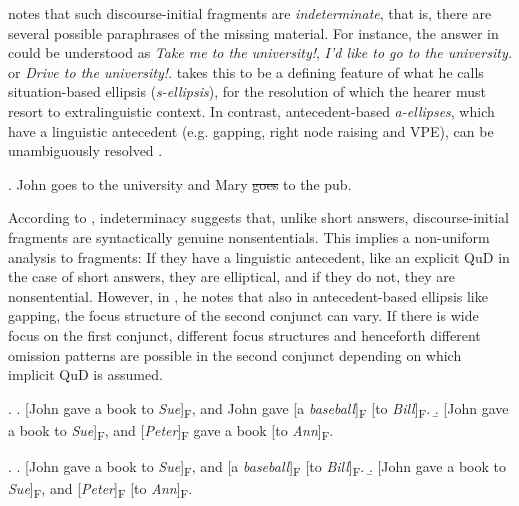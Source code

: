 \citet[1852]{reich2011} notes that such discourse-initial fragments are \textit{indeterminate}, that is, there are several possible paraphrases of the missing material. For instance, the answer in \LLast[a] could be understood as \textit{Take me to the university!}, \textit{I'd like to go to the university.} or \textit{Drive to the university!}. \citeauthor{reich2011} takes this to be a defining feature of what he calls situation-based ellipsis (\textit{s-ellipsis}), for the resolution of which the hearer must resort to extralinguistic context. In contrast, antecedent-based \textit{a-ellipses}, which have a linguistic antecedent (e.g. gapping, right node raising and VPE), can be unambiguously resolved \Next.

\ex. John goes to the university and Mary \sout{goes} to the pub.

According to \citet[1852]{reich2011}, indeterminacy suggests that, unlike short answers, discourse-initial fragments are syntactically genuine nonsententials. This implies a non-uniform analysis to fragments: If they have a linguistic antecedent, like an explicit QuD in the case of short answers, they are elliptical, and if they do not, they are nonsentential. However, in \citet{reich2007}, he notes that also in antecedent-based ellipsis like gapping, the focus structure of the second conjunct can vary. If there is wide focus on the first conjunct, different focus structures \Next and henceforth different omission patterns \NNext are possible in the second conjunct depending on which implicit QuD is assumed.\largerpage[2]

\ex. \a. [John gave a book to \textit{Sue}]\textsubscript{F}, and John gave [a \textit{baseball}]\textsubscript{F} [to \textit{Bill}]\textsubscript{F}. 
    \b. [John gave a book to \textit{Sue}]\textsubscript{F}, and [\textit{Peter}]\textsubscript{F} gave a book [to \textit{Ann}]\textsubscript{F}.\\ \mbox{}\hfill\hfill\citep[478]{reich2007}

\ex. \a. [John gave a book to \textit{Sue}]\textsubscript{F}, and [a \textit{baseball}]\textsubscript{F} [to \textit{Bill}]\textsubscript{F}. 
    \b. [John gave a book to \textit{Sue}]\textsubscript{F}, and [\textit{Peter}]\textsubscript{F} [to \textit{Ann}]\textsubscript{F}.\\ \mbox{}\hfill\hfill\citep[478]{reich2007}
    
